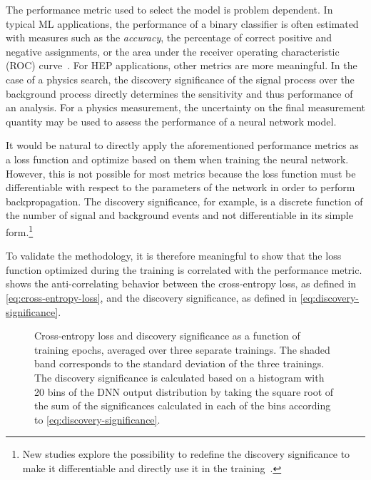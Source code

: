 The performance metric used to select the model is problem dependent.
In typical ML applications, the performance of a binary classifier is often estimated with measures such as the \emph{accuracy}, the percentage of correct positive and negative assignments, or the area under the receiver operating characteristic (ROC) curve~\cite{BRADLEY19971145}. 
For HEP applications, other metrics are more meaningful. In the case of a physics search, the discovery significance of the signal process over the background process directly determines the sensitivity and thus performance of an analysis. 
For a physics measurement, the uncertainty on the final measurement quantity may be used to assess the performance of a neural network model.

It would be natural to directly apply the aforementioned performance metrics as a loss function and optimize based on them when training the neural network.
However, this is not possible for most metrics because the loss function must be differentiable with respect to the parameters of the network in order to perform backpropagation. The discovery significance, for example, is a discrete function of the number of signal and background events and not differentiable in its simple form.\footnote{New studies explore the possibility to redefine the discovery significance to make it differentiable and directly use it in the training~\cite{ELWOODZ0INML}.}

To validate the methodology, it is therefore meaningful to show that the loss function optimized during the training is correlated with the performance metric. 
 shows the anti-correlating behavior between the cross-entropy loss, as defined in \cref{eq:cross-entropy-loss}, and the discovery significance, as defined in \cref{eq:discovery-significance}.

\begin{figure}[t]
    \caption{Cross-entropy loss and discovery significance as a function of training epochs, averaged over three separate trainings. The shaded band corresponds to the standard deviation of the three trainings. The discovery significance is calculated based on a histogram with 20 bins of the DNN output distribution by taking the square root of the sum of the significances calculated in each of the bins according to \cref{eq:discovery-significance}.}
    \label{fig:loss-vs-sign}
\end{figure}

